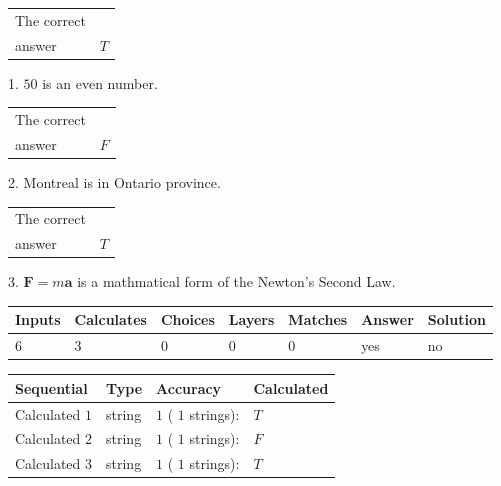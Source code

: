 \documentclass[12pt]{article}
\begin{document}
 
 
\noindent{}
 
 

 
\noindent\begin{tabular}{|l|l|}\hline The correct & \\
          answer &  %
$T$ \\ \hline \end{tabular}
1. $ %
50$ is an  %
even number.
 
\noindent\begin{tabular}{|l|l|}\hline The correct & \\
          answer &  %
$F$ \\ \hline \end{tabular}
2.  %
Montreal is in  %
Ontario province.
 
\noindent\begin{tabular}{|l|l|}\hline The correct & \\
          answer &  %
$T$ \\ \hline \end{tabular}
3.  %
$\mathbf{F}=m\mathbf{a}$ is a mathmatical form of  %
the Newton's Second Law.
 
 
 
\noindent{}
 
 

 
\vspace{0.3in}
   
   
   
   
\noindent\begin{tabular}{|l|l|l|l|l|l|l|}
 \hline
Inputs & Calculates & Choices & Layers & Matches & Answer & Solution \\ \hline
           6  & 
           3  & 
           0
  & 
           0  & 
           0  & 
  yes & 
  no 
  \\ \hline
 \end{tabular}
   
   
   
   
\noindent{}
   
   
  
  
\noindent\begin{tabular}{|l|l|l|l|}
\hline
 Sequential & Type & Accuracy & Calculated \\ 
\hline
 
 
  Calculated $            1 $ & string & $            1  $ ( $           1  $ strings): 
 & $T$
 \\  \hline  
 
 
  Calculated $            2 $ & string & $            1  $ ( $           1  $ strings): 
 & $F$
 \\  \hline  
 
 
  Calculated $            3 $ & string & $            1  $ ( $           1  $ strings): 
 & $T$
 \\  \hline  
 \end{tabular}
   
\end{document}
